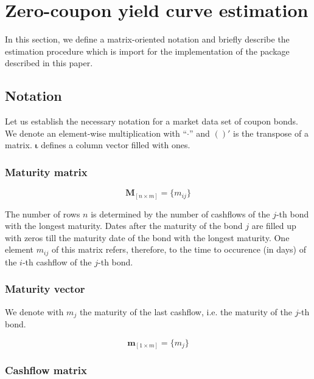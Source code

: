 \section{Zero-coupon yield curve estimation}

In this section, we define a matrix-oriented notation and briefly describe the estimation procedure which is import for the implementation of the  package described in this paper.

\subsection{Notation}
\label{sec:notation}

Let us establish the necessary notation for a market data set of coupon bonds. We denote an element-wise multiplication with ``$\cdot$'' and $( )'$ is the transpose of a matrix. $\bm{\iota}$ defines a column vector filled with ones.

\subsubsection*{Maturity matrix}

\begin{equation*}\label{maturitym}
\bm{M}_{\left[n\times m\right]}= \{m_{ij}\}
\end{equation*}

The number of rows $n$ is determined by the number of cashflows of the $j$-th bond with the longest maturity. Dates after the maturity of the bond $j$ are filled up with zeros till the maturity date of the bond with the longest maturity. One element $m_{ij}$ of this matrix refers, therefore, to the time to occurence (in days) of the $i$-th cashflow of the $j$-th bond. 

\subsubsection*{Maturity vector}

We denote with $m_j$ the maturity of the last cashflow, i.e. the maturity of the $j$-th bond.

\begin{equation*}\label{weights}
    \bm{m}_{\left[1\times m\right]}= \{m_j\}
\end{equation*}

\subsubsection*{Cashflow matrix}


